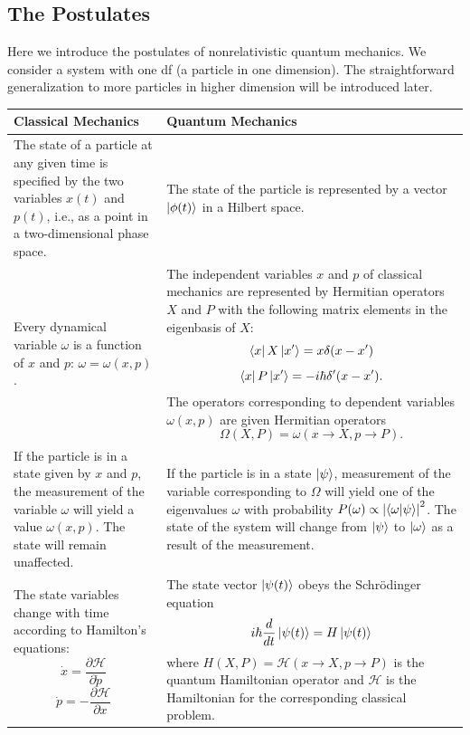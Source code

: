 \documentclass{book}
\theoremstyle{definition}
\newcommand{\p}{\partial}
\newcommand{\ham}{\mathcal{H}}
\newcommand{\f}[2]{\frac{#1}{#2}}
\begin{document}
\subsection{The Postulates}

Here we introduce the postulates of nonrelativistic quantum mechanics. We consider a system with one df (a particle in one dimension). The straightforward generalization to more particles in higher dimension will be introduced later. \\

\noindent
\begin{tabular}{|p{4cm}|p{7.2cm}|}
	\hline
	\textbf{Classical Mechanics} & \textbf{Quantum Mechanics}\\ \hline
	The state of a particle at any given time is specified by the two variables $x(t)$ and $p(t)$, i.e., as a point in a two-dimensional phase space. & The state of the particle is represented by a vector $\ket{\phi(t)}$ in a Hilbert space.\\ \hline
	Every dynamical variable $\omega$ is a function of $x$ and $p$: $\omega = \omega(x,p)$. & The independent variables $x$ and $p$ of classical mechanics are represented by Hermitian operators $X$ and $P$ with the following matrix elements in the eigenbasis of $X$: \begin{equation}
	\bra{x}X\ket{x'} = x\delta(x-x')
	\end{equation}
	\begin{equation}
	\bra{x}P\ket{x'}= -i\hbar\delta'(x-x').
	\end{equation}
	The operators corresponding to dependent variables $\omega(x,p)$ are given Hermitian operators
	\begin{equation} 
	\Omega(X,P) = \omega(x\to X, p \to P).
	\end{equation}\\ \hline
	If the particle is in a state given by $x$ and $p$, the measurement of the variable $\omega$ will yield a value $\omega(x,p)$. The state will remain unaffected. & If the particle is in a state $\ket{\psi}$, measurement of the variable corresponding to $\Omega$ will yield one of the eigenvalues $\omega$ with probability $P(\omega)\propto \abs{\braket{\omega}{\psi}}^2$. The state of the system will change from $\ket{\psi}$ to $\ket{\omega}$ as a result of the measurement.\\ \hline
	The state variables change with time according to Hamilton's equations: 
	\begin{equation}
	\dot{x} = \f{\p \ham}{\p \dot{p}}
	\end{equation}
	\begin{equation}
	\dot{p} = -\f{\p \ham}{\p x}
	\end{equation}
	&
	The state vector $\ket{\psi(t)}$ obeys the Schr\"{o}dinger equation 
	\begin{equation}
	i\hbar\f{d}{dt}\ket{\psi(t)} = H\ket{\psi(t)}
	\end{equation}
	where $H(X,P)=\ham(x\to X, p\to P)$ is the quantum Hamiltonian operator and $\ham$ is the Hamiltonian for the corresponding classical problem.\\\hline
\end{tabular}
\end{document}
